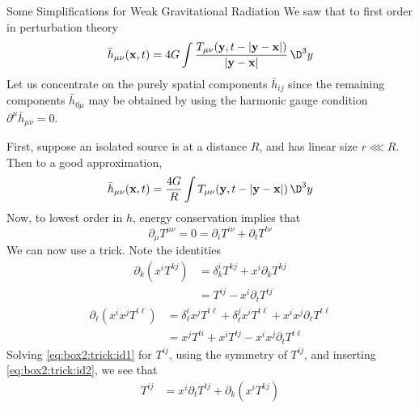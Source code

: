 

\begin{Boxed}{Some Simplifications for Weak Gravitational Radiation}
We saw that to first order in perturbation theory
\begin{equation}
\bar{h}_{\mu\nu}(\mathbf{x},t)=
4G\int\frac{T_{\mu\nu}(\mathbf{y},t-|\mathbf{y}-\mathbf{x}|)}{|\mathbf{y}-\mathbf{x}|}\,\D^{3}y
\end{equation}
Let us concentrate on the purely spatial components
$\bar{h}_{ij}$ since the remaining components $\bar{h}_{0\mu}$
may be obtained by using the harmonic gauge condition
$\partial^{\mu}\bar{h}_{\mu\nu}=0$.

First, suppose an isolated source is at a distance $R$, and has
linear size $r\lll R$. Then to a good approximation,
\begin{equation}\label{eq:box2:goodApprox}
\bar{h}_{\mu\nu}(\mathbf{x},t)=
\frac{4G}{R}\int T_{\mu\nu}(\mathbf{y},t-|\mathbf{y}-\mathbf{x}|)\,\D^{3}y
\end{equation}
Now, to lowest order in $h$, energy conservation implies that
\begin{equation}
\partial_{\mu}T^{\mu\nu}=0=\partial_{i}T^{i\nu}+\partial_{t}T^{t\nu}
\end{equation}
We can now use a trick. Note the identities
\begin{equation}\label{eq:box2:trick:id1}
\begin{split}
\partial_{k}(x^{i}T^{kj})&=\delta^{i}_{k}T^{kj}+x^{i}\partial_{k}T^{kj}\\
&=T^{ij}-x^{i}\partial_{t}T^{tj}
\end{split}
\end{equation}
\begin{equation}\label{eq:box2:trick:id2}
\begin{split}
\partial_{\ell}(x^{i}x^{j}T^{t\ell})
&=\delta^{i}_{\ell}x^{j}T^{t\ell}+\delta^{j}_{\ell}x^{i}T^{t\ell}
+x^{i}x^{j}\partial_{\ell}T^{t\ell}\\
&=x^{j}T^{ti}+x^{i}T^{tj}-x^{i}x^{j}\partial_{t}T^{t\ell}
\end{split}
\end{equation}
Solving \eqref{eq:box2:trick:id1} for $T^{ij}$, using the
symmetry of $T^{ij}$, and inserting \eqref{eq:box2:trick:id2},
we see that
\begin{align}
T^{ij}
&=x^{i}\partial_{t}T^{tj}+\partial_{k}(x^{i}T^{kj})\nonumber\\

\end{align}
\end{Boxed}
